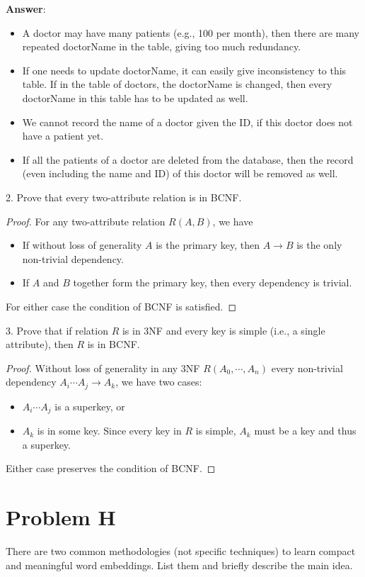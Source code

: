 \documentclass{article}
\begin{document}
{\bf Answer}: 
\begin{itemize}
\item A doctor may have many patients (e.g., 100 per month), then there are many repeated doctorName in the table, giving too much redundancy.
\item If one needs to update doctorName, it can easily give inconsistency to this table. If in the table of doctors, the doctorName is changed, then every doctorName in this table has to be updated as well. 
\item We cannot record the name of a doctor given the ID, if this doctor does not have a patient yet.
\item If all the patients of a doctor are deleted from the database, then the record (even including the name and ID) of this doctor will be removed as well.
\end{itemize}

2. Prove that every two-attribute relation is in BCNF.
\begin{proof}
For any two-attribute relation $R(A, B)$, we have
\begin{itemize}
\item If without loss of generality $A$ is the primary key, then $A \to B$ is the only non-trivial dependency. 
\item If $A$ and $B$ together form the primary key, then every dependency is trivial.
\end{itemize}
For either case the condition of BCNF is satisfied.
\end{proof}

3. Prove that if relation $R$ is in 3NF and every key is simple (i.e., a single attribute), then $R$ is in BCNF.
\begin{proof}
Without loss of generality in any 3NF $R(A_0, \cdots, A_n)$ every non-trivial dependency $A_i \cdots A_j \to A_k$, we have two cases:
\begin{itemize}
\item $A_i \cdots A_j$ is a superkey, or
\item $A_k$ is in some key. Since every key in $R$ is simple, $A_k$ must be a key and thus a superkey.
\end{itemize}
Either case preserves the condition of BCNF.
\end{proof}

\section{Problem H}
There are two common methodologies (not specific techniques) to learn compact and meaningful word embeddings. List them and briefly describe the main idea.
\end{document}
